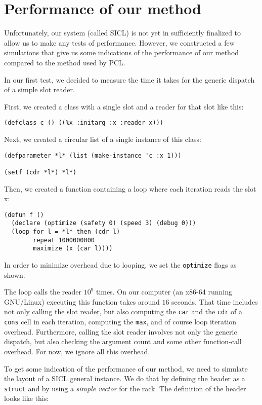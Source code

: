 \section{Performance of our method}

Unfortunately, our system (called SICL) is not yet in sufficiently
finalized to allow us to make any tests of performance.  However, we
constructed a few simulations that give us some indications of the
performance of our method compared to the method used by PCL.

In our first test, we decided to measure the time it takes for the
generic dispatch of a simple slot reader. 

First, we created a class with a single slot and a reader for that
slot like this:

\begin{verbatim}
(defclass c () ((%x :initarg :x :reader x)))  
\end{verbatim}

Next, we created a circular list of a single instance of this class:

\begin{verbatim}
(defparameter *l* (list (make-instance 'c :x 1)))

(setf (cdr *l*) *l*)
\end{verbatim}

Then, we created a function containing a loop where each iteration
reads the slot x:

\begin{verbatim}
(defun f ()
  (declare (optimize (safety 0) (speed 3) (debug 0)))
  (loop for l = *l* then (cdr l)
        repeat 1000000000
        maximize (x (car l))))
\end{verbatim}

In order to minimize overhead due to looping, we set the
\texttt{optimize} flags as shown. 

The loop calls the reader $10^9$ times.  On our computer (an x86-64
running GNU/Linux) executing this function takes around $16$ seconds.
That time includes not only calling the slot reader, but also
computing the \texttt{car} and the \texttt{cdr} of a \texttt{cons}
cell in each iteration, computing the \texttt{max}, and of course loop
iteration overhead.  Furthermore, calling the slot reader involves not
only the generic dispatch, but also checking the argument count and
some other function-call overhead.  For now, we ignore all this
overhead. 

To get some indication of the performance of our method, we need to
simulate the layout of a SICL general instance.  We do that by
defining the header as a \cl{} \texttt{struct} and by using a
\emph{simple vector} for the rack.  The definition of the header looks
like this:

